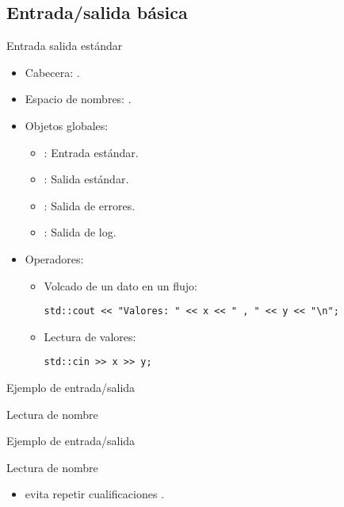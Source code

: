 \subsection{Entrada/salida básica}

\begin{frame}[t,fragile]{Entrada salida estándar}
\begin{itemize}
  \item Cabecera: .
  \item Espacio de nombres: .
  \item Objetos globales:
    \begin{itemize}
      \item {}: Entrada estándar.
      \item {}: Salida estándar.
      \item {}: Salida de errores.
      \item {}: Salida de log.
    \end{itemize}
  \item Operadores:
    \begin{itemize}
      \item Volcado de un dato en un flujo:
\begin{lstlisting}
std::cout << "Valores: " << x << " , " << y << "\n";
\end{lstlisting}
      \item Lectura de valores:
\begin{lstlisting}
std::cin >> x >> y;
\end{lstlisting}
  \end{itemize}
\end{itemize}
\end{frame}

\begin{frame}[t,fragile]{Ejemplo de entrada/salida}
\begin{block}{Lectura de nombre}

\end{block}
\end{frame}

\begin{frame}[t,fragile]{Ejemplo de entrada/salida}
\begin{block}{Lectura de nombre}

\end{block}
\begin{itemize}
  \item {} evita repetir cualificaciones .
\end{itemize}
\end{frame}
